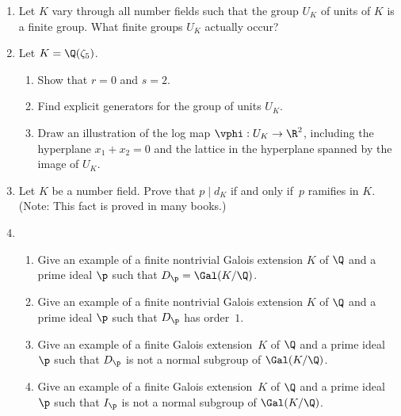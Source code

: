 \begin{enumerate}
\item Let $K$ vary through all number fields such that the
group $U_K$ of units of $K$ is a finite group.  What finite groups
$U_K$ actually occur?

\item Let $K=\Q(\zeta_5)$.
\begin{enumerate}
\item Show that $r=0$ and $s=2$.
\item Find explicit generators for the group of
units $U_K$.
\item Draw an illustration of the log map
$\vphi:U_K\to \R^2$, including the hyperplane
$x_1+x_2=0$ and the lattice in the hyperplane 
spanned by the image of $U_K$.
\end{enumerate}






\item Let $K$ be a number field.  Prove that $p\mid d_K$ if and only
  if~$p$ ramifies in $K$.  (Note: This fact is proved in many
  books.)


\item 
\begin{enumerate}
\item Give an example of a finite nontrivial Galois extension $K$ of $\Q$
and a prime ideal $\p$ such that $D_\p = \Gal(K/\Q)$.
\item Give an example of a finite nontrivial Galois extension $K$ of
  $\Q$ and a prime ideal $\p$ such that $D_\p$ has order~$1$.
\item Give an example of a finite Galois extension~$K$ of
  $\Q$ and a prime ideal $\p$ such that $D_\p$ is not a normal
  subgroup of $\Gal(K/\Q)$.
\item Give an example of a finite Galois extension~$K$ of
  $\Q$ and a prime ideal $\p$ such that $I_\p$ is not a normal
  subgroup of $\Gal(K/\Q)$.
\end{enumerate}


\end{enumerate}
